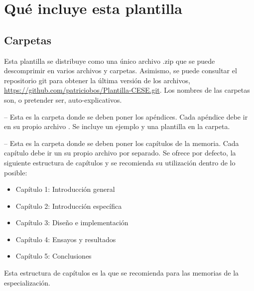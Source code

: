 



\section{Qué incluye esta plantilla}

\subsection{Carpetas}

Esta plantilla se distribuye como una único archivo .zip que se puede descomprimir en varios archivos y carpetas. Asimismo, se puede consultar el repositorio git para obtener la última versión de los archivos, \url{https://github.com/patriciobos/Plantilla-CESE.git}. Los nombres de las carpetas son, o pretender ser, auto-explicativos.

 -- Esta es la carpeta donde se deben poner los apéndices. Cada apéndice debe ir en su propio archivo . Se incluye un ejemplo y una plantilla en la carpeta.

 -- Esta es la carpeta donde se deben poner los capítulos de la memoria. Cada capítulo debe ir un su propio archivo  por separado.  Se ofrece por defecto, la siguiente estructura de capítulos y se recomienda su utilización dentro de lo posible:

\begin{itemize}
\item Capítulo 1: Introducción general	
\item Capítulo 2: Introducción específica
\item Capítulo 3: Diseño e implementación
\item Capítulo 4: Ensayos y resultados
\item Capítulo 5: Conclusiones

\end{itemize}

Esta estructura de capítulos es la que se recomienda para las memorias de la especialización.

